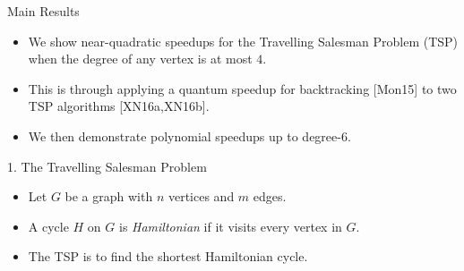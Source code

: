 \documentclass[]{templates/poster}
\begin{document}

\begin{frame}{} 

\begin{columns}[t]
  \begin{column}{0.422\linewidth}
  \begin{block}{\Large Main Results}
  \begin{itemize}
  \item We show near-quadratic speedups for the Travelling Salesman Problem (TSP) when the degree of any vertex is at most $4$.
  
  \item This is through applying a quantum speedup for backtracking [Mon15] to two TSP algorithms [XN16a,XN16b].
  
  \item We then demonstrate polynomial speedups up to degree-6.
  \end{itemize}
  \end{block}

  \begin{block}{\Large 1. The Travelling Salesman Problem}
  \begin{itemize}
  \item Let $G$ be a graph with $n$ vertices and $m$ edges.
  
  \item A cycle $H$ on $G$ is {\em Hamiltonian} if it visits every vertex in $G$.
  
  \item The TSP is to find the shortest Hamiltonian cycle.
  

\end{itemize}
\end{block}
\end{column}
\end{columns}
\end{frame}
\end{document}
